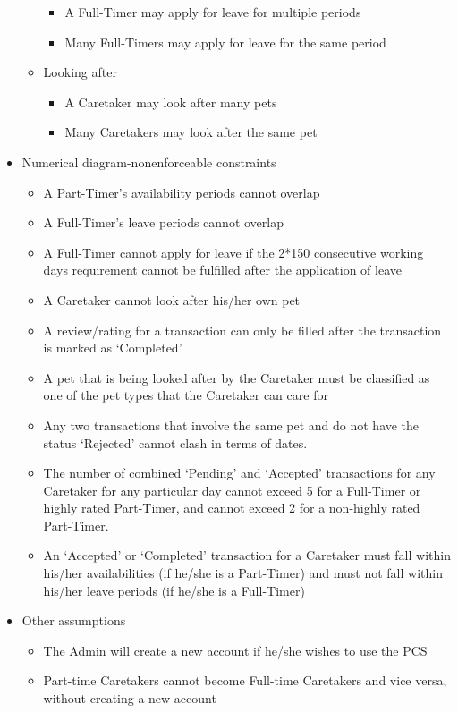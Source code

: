 \documentclass[10pt]{article}
\begin{document}
\begin{itemize}
\begin{itemize}
        \begin{itemize}
            \item A Full-Timer may apply for leave for multiple periods
            \item Many Full-Timers may apply for leave for the same period
	    \end{itemize}
        \item Looking after
        \begin{itemize}
            \item A Caretaker may look after many pets
            \item Many Caretakers may look after the same pet
        \end{itemize}
    \end{itemize}
    
    \item Numerical diagram-nonenforceable constraints
    \begin{itemize}
        \item A Part-Timer's availability periods cannot overlap
        \item A Full-Timer's leave periods cannot overlap
        \item A Full-Timer cannot apply for leave if the 2*150 consecutive working days requirement cannot be fulfilled after the application of leave
        \item A Caretaker cannot look after his/her own pet
        \item A review/rating for a transaction can only be filled after the transaction is marked as `Completed'
        \item A pet that is being looked after by the Caretaker must be classified as one of the pet types that the Caretaker can care for
        \item Any two transactions that involve the same pet and do not have the status `Rejected' cannot clash in terms of dates.
        \item The number of combined `Pending' and `Accepted' transactions for any Caretaker for any particular day cannot exceed 5 for a Full-Timer or highly rated Part-Timer, and cannot exceed 2 for a non-highly rated Part-Timer.
        \item An `Accepted' or `Completed' transaction for a Caretaker must fall within his/her availabilities (if he/she is a Part-Timer) and must not fall within his/her leave periods (if he/she is a Full-Timer)
    \end{itemize}
    
    \item Other assumptions
    \begin{itemize}
        \item The Admin will create a new account if he/she wishes to use the PCS
        \item Part-time Caretakers cannot become Full-time Caretakers and vice versa, without creating a new account
    \end{itemize}
\end{itemize} %
\end{document}
